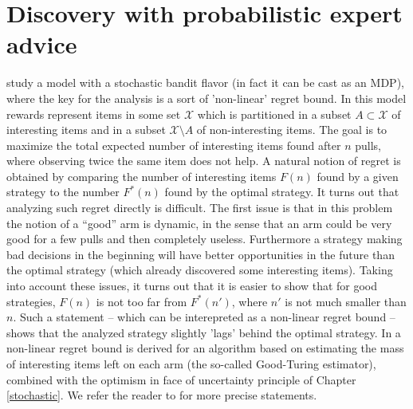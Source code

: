 \documentclass[11pt]{hackednow}
\newcommand{\cX}{\mathcal{X}}
\begin{document}
\section{Discovery with probabilistic expert advice}
\cite{BEG11} study a model with a stochastic bandit flavor (in fact it can be cast as an MDP), where the key for the analysis is a sort of 'non-linear' regret bound.
In this model rewards represent items in some set $\cX$ which is partitioned in a subset  $A \subset \cX$ of interesting items and in a subset $\cX\setminus A$ of non-interesting items. The goal is to maximize the total expected number of interesting items found after $n$ pulls, where observing twice the same item does not help. A natural notion of regret is obtained by comparing the number of interesting items $F(n)$ found by a given strategy to the number $F^*(n)$ found by the optimal strategy. It turns out that analyzing such regret directly is difficult. The first issue is that in this problem the notion of a ``good'' arm is dynamic, in the sense that an arm could be very good for a few pulls and then completely useless. Furthermore a strategy making bad decisions in the beginning will have better opportunities in the future than the optimal strategy (which already discovered some interesting items). Taking into account these issues, it turns out that it is easier to show that for good strategies, $F(n)$ is not too far from $F^*(n')$, where $n'$ is not much smaller than $n$. Such a statement -- which can be interepreted as a non-linear regret bound -- shows that the analyzed strategy slightly 'lags' behind the optimal strategy. In \cite{BEG11} a non-linear regret bound is derived for an algorithm based on estimating the mass of interesting items left on each arm (the so-called Good-Turing estimator), combined with the optimism in face of uncertainty principle of Chapter \ref{stochastic}. We refer the reader to \cite{BEG11} for more precise statements.
\end{document}
